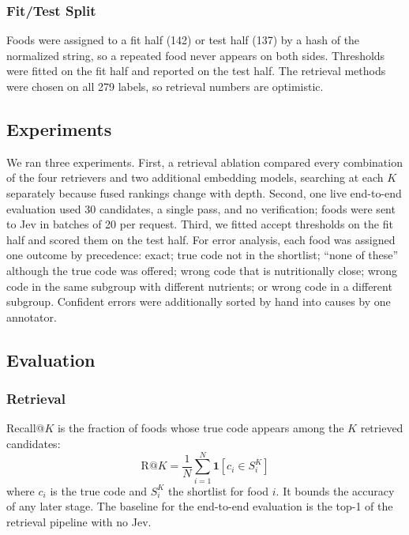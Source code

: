 \documentclass[11pt,journal,onecolumn]{IEEEtran}
\begin{document}
\subsubsection{Fit/Test Split}
Foods were assigned to a fit half (142) or test half (137) by a hash of the normalized string, so a repeated food never appears on both sides. Thresholds were fitted on the fit half and reported on the test half. The retrieval methods were chosen on all 279 labels, so retrieval numbers are optimistic.

\subsection{Experiments}
We ran three experiments. First, a retrieval ablation compared every combination of the four retrievers and two additional embedding models, searching at each $K$ separately because fused rankings change with depth. Second, one live end-to-end evaluation used 30 candidates, a single pass, and no verification; foods were sent to Jev in batches of 20 per request. Third, we fitted accept thresholds on the fit half and scored them on the test half. For error analysis, each food was assigned one outcome by precedence: exact; true code not in the shortlist; ``none of these'' although the true code was offered; wrong code that is nutritionally close; wrong code in the same subgroup with different nutrients; or wrong code in a different subgroup. Confident errors were additionally sorted by hand into causes by one annotator.

\subsection{Evaluation}
\subsubsection{Retrieval}
Recall@$K$ is the fraction of foods whose true code appears among the $K$ retrieved candidates:
\begin{equation}
\mathrm{R@}K=\frac{1}{N}\sum_{i=1}^{N}\mathbf{1}\left[c_i\in S_i^{K}\right]
\end{equation}
where $c_i$ is the true code and $S_i^{K}$ the shortlist for food $i$. It bounds the accuracy of any later stage. The baseline for the end-to-end evaluation is the top-1 of the retrieval pipeline with no Jev.
\end{document}
